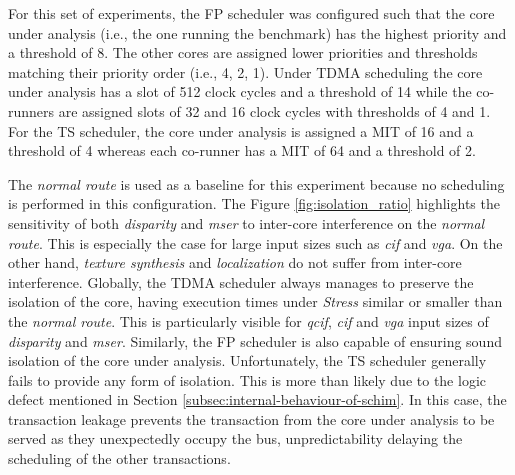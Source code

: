 For this set of experiments, the FP scheduler was configured such that the core under
analysis (i.e., the one running the benchmark) has the highest priority
and a threshold of 8. The other cores are assigned lower priorities and
thresholds matching their priority order (i.e., 4, 2, 1). Under TDMA scheduling the core under analysis has a slot of 512 clock cycles and a threshold of 14 while the co-runners are assigned slots of 32 and 16 clock cycles with thresholds of 4 and 1. For the TS scheduler, the core under analysis is assigned a MIT of 16 and a threshold of 4 whereas each co-runner has a MIT of 64 and a threshold of 2.

The \emph{normal route} is used as a baseline for this experiment
because no scheduling is performed in this configuration.
The Figure \ref{fig:isolation_ratio} highlights the sensitivity of both
\emph{disparity} and \emph{mser} to inter-core interference on the
\emph{normal route}. This is especially the case for large input sizes
such as \emph{cif} and \emph{vga}. On the other hand, \emph{texture
synthesis} and \emph{localization} do not suffer from inter-core
interference.
Globally, the TDMA scheduler always manages to preserve the isolation of
the core, having execution times under \emph{Stress} similar or smaller than the \emph{normal route}. This is particularly visible for \emph{qcif}, \emph{cif} and \emph{vga} input sizes of \emph{disparity} and \emph{mser}.
Similarly, the FP scheduler is also capable of ensuring sound
isolation of the core under analysis.
Unfortunately, the TS scheduler generally fails to provide any form of
isolation. This is more than likely due to the logic defect mentioned in
Section \ref{subsec:internal-behaviour-of-schim}. In this case, the transaction leakage
prevents the transaction from the core under analysis to be served as they
unexpectedly occupy the bus, unpredictability delaying the scheduling of the other transactions.
